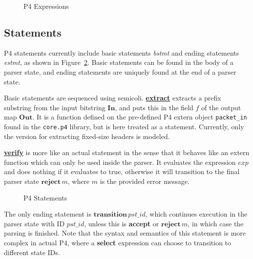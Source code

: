 \documentclass[UTF8]{article}
\begin{document}
\begin{figure}[h!]
\centering\ottgrammartabular{
\ottexp\ottafterlastrule
}
\caption{P4 Expressions}
\label{fig:exp}
\end{figure}

\newpage
\subsection{Statements}
\newcommand{\bstmt}{\textit{bstmt}}
\newcommand{\estmt}{\textit{estmt}}
\newcommand{\transition}[1]{$\textbf{transition} \, {#1}$}
\newcommand{\start}{\textbf{start}}
\newcommand{\accept}{\textbf{accept}}
\newcommand{\reject}[1]{$\textbf{reject} \, {#1}$}
P4 statements currently include basic statements \bstmt{} and ending statements \estmt{}, as shown in Figure~\ref{fig:stmt}. Basic statements can be found in the body of a parser state, and ending statements are uniquely found at the end of a parser state.

Basic statements are sequenced using semicoli. \href{https://p4.org/p4-spec/docs/P4-16-v1.2.1.html#sec-packet-data-extraction}{\textbf{extract}} extracts a prefix substring from the input bitstring $\mathbf{In}$, and puts this in the field $f$ of the output map $\mathbf{Out}$. It is a function defined on the pre-defined P4 extern object \texttt{packet\_in} found in the \texttt{core.p4} library, but is here treated as a statement.  Currently, only the version for extracting fixed-size headers is modeled.

\href{https://p4.org/p4-spec/docs/P4-16-v1.2.1.html#sec-verify}{\textbf{verify}} is more like an actual statement in the sense that it behaves like an extern function which can only be used inside the parser. It evaluates the expression $\textit{exp}$ and does nothing if it evaluates to true, otherwise it will transition to the final parser state \reject{m}, where $m$ is the provided error message.

\begin{figure}[h!]
\centering\ottgrammartabular{
\ottbstmt\ottinterrule
\ottestmt\ottafterlastrule
}
\caption{P4 Statements}
\label{fig:stmt}
\end{figure}

The only ending statement is \href{https://p4.org/p4-spec/docs/P4-16-v1.2.1.html#sec-transition}{\transition{pst\_id}}, which continues execution in the parser state with ID $\textit{pst\_id}$,  unless this is \accept{} or \reject{m}, in which case the parsing is finished. Note that the syntax and semantics of this statement is more complex in actual P4, where a \textbf{select} expression can choose to transition to different state IDs.
\end{document}

